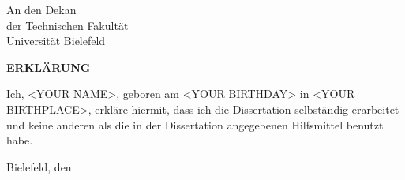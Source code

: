 \documentclass[11pt,a4paper]{article}
\begin{document}
\pagestyle{empty}
\noindent
An den Dekan\\
der Technischen Fakult\"at\\
Universit\"at Bielefeld

\vspace{2cm}

\begin{center}
  {\bf \Large ERKL\"ARUNG}
\end{center}

\vspace{2cm}

\noindent Ich, <YOUR NAME>, geboren am <YOUR BIRTHDAY> in <YOUR BIRTHPLACE>, erkl\"are hiermit,
dass ich die Dissertation selbst\"andig erarbeitet und keine anderen als
die in der Dissertation angegebenen Hilfsmittel benutzt habe.

\vspace{4cm}


\noindent Bielefeld, den \date {}
\end{document}
